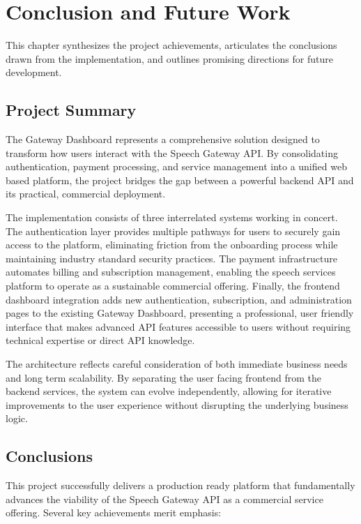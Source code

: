 \chapter{Conclusion and Future Work}
\label{chap:conclusion}

This chapter synthesizes the project achievements, articulates the conclusions drawn from the implementation, and outlines promising directions for future development.

\section{Project Summary}

The Gateway Dashboard represents a comprehensive solution designed to transform how users interact with the Speech Gateway API. By consolidating authentication, payment processing, and service management into a unified web based platform, the project bridges the gap between a powerful backend API and its practical, commercial deployment.

The implementation consists of three interrelated systems working in concert. The authentication layer provides multiple pathways for users to securely gain access to the platform, eliminating friction from the onboarding process while maintaining industry standard security practices. The payment infrastructure automates billing and subscription management, enabling the speech services platform to operate as a sustainable commercial offering. Finally, the frontend dashboard integration adds new authentication, subscription, and administration pages to the existing Gateway Dashboard, presenting a professional, user friendly interface that makes advanced API features accessible to users without requiring technical expertise or direct API knowledge.

The architecture reflects careful consideration of both immediate business needs and long term scalability. By separating the user facing frontend from the backend services, the system can evolve independently, allowing for iterative improvements to the user experience without disrupting the underlying business logic.

\section{Conclusions}

This project successfully delivers a production ready platform that fundamentally advances the viability of the Speech Gateway API as a commercial service offering. Several key achievements merit emphasis:

